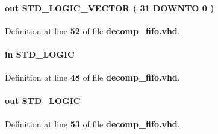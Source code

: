 \paragraph[{q}]{ {\bfseries \textcolor{keywordflow}{out}\textcolor{vhdlchar}{ }} {\bfseries \textcolor{comment}{S\+T\+D\+\_\+\+L\+O\+G\+I\+C\+\_\+\+V\+E\+C\+T\+OR}\textcolor{vhdlchar}{ }\textcolor{vhdlchar}{(}\textcolor{vhdlchar}{ }\textcolor{vhdlchar}{ } \textcolor{vhdldigit}{31} \textcolor{vhdlchar}{ }\textcolor{keywordflow}{D\+O\+W\+N\+TO}\textcolor{vhdlchar}{ }\textcolor{vhdlchar}{ } \textcolor{vhdldigit}{0} \textcolor{vhdlchar}{ }\textcolor{vhdlchar}{)}\textcolor{vhdlchar}{ }} \hspace{0.3cm}{\ttfamily [Port]}}\label{classdecomp__fifo_aea5fb4b3a050af0b1556be3e3b21cef9}


Definition at line {\bf 52} of file {\bf decomp\+\_\+fifo.\+vhd}.

\paragraph[{rdclk}]{ {\bfseries \textcolor{keywordflow}{in}\textcolor{vhdlchar}{ }} {\bfseries \textcolor{comment}{S\+T\+D\+\_\+\+L\+O\+G\+IC}\textcolor{vhdlchar}{ }} \hspace{0.3cm}{\ttfamily [Port]}}\label{classdecomp__fifo_a463d5fc49d1826e964692ab15a4459e5}


Definition at line {\bf 48} of file {\bf decomp\+\_\+fifo.\+vhd}.

\paragraph[{rdempty}]{ {\bfseries \textcolor{keywordflow}{out}\textcolor{vhdlchar}{ }} {\bfseries \textcolor{comment}{S\+T\+D\+\_\+\+L\+O\+G\+IC}\textcolor{vhdlchar}{ }} \hspace{0.3cm}{\ttfamily [Port]}}\label{classdecomp__fifo_afc6d6b8085df7af6f9c5d7dc39b1157c}


Definition at line {\bf 53} of file {\bf decomp\+\_\+fifo.\+vhd}.

